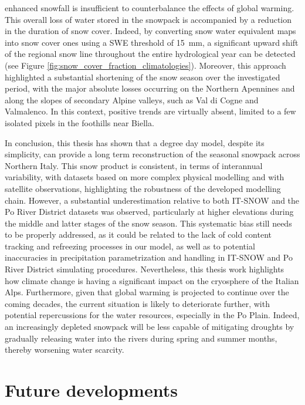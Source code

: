 enhanced snowfall is insufficient to counterbalance the effects of global warming. This overall loss of water stored in the snowpack is accompanied by a 
reduction in the duration of snow cover. Indeed, by converting snow water equivalent maps into snow cover ones using a SWE threshold of \SI{15}{\milli\meter}, 
a significant upward shift of the regional snow line throughout the entire hydrological year can be detected (see Figure \ref{fig:snow_cover_fraction_climatologies}). 
Moreover, this approach highlighted a substantial shortening of the snow season over the investigated period, with the major absolute losses occurring on 
the Northern Apennines and along the slopes of secondary Alpine valleys, such as Val di Cogne and Valmalenco. In this context, positive trends are virtually 
absent, limited to a few isolated pixels in the foothills near Biella.

In conclusion, this thesis has shown that a degree day model, despite its simplicity, can provide a long term reconstruction of the seasonal snowpack 
across Northern Italy. This snow product is consistent, in terms of interannual variability, with datasets based on more complex physical modelling 
and with satellite observations, highlighting the robustness of the developed modelling chain. However, a substantial underestimation relative to both 
IT-SNOW and the Po River District datasets was observed, particularly at higher elevations during the middle and latter stages of the snow season. This 
systematic bias still needs to be properly addressed, as it could be related to the lack of cold content tracking and refreezing processes in our model, 
as well as to potential inaccuracies in precipitation parametrization and handling in IT-SNOW and Po River District simulating procedures. Nevertheless, 
this thesis work highlights how climate change is having a significant impact on the cryosphere of the Italian Alps. Furthermore, given that global 
warming is projected to continue over the coming decades, the current situation is likely to deteriorate further, with potential repercussions for the 
water resources, especially in the Po Plain. Indeed, an increasingly depleted snowpack will be less capable of mitigating droughts by gradually releasing 
water into the rivers during spring and summer months, thereby worsening water scarcity.




\section{Future developments}

